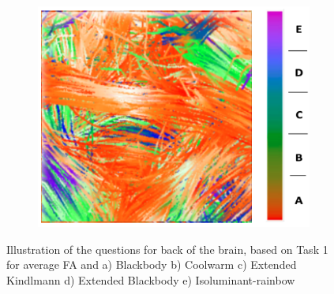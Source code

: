 \documentclass[hyperref, plainreport, noproblem]{cgvpub1}
\begin{document}
\begin{figure}[ht]
\begin{subfigure}[b]{0.45\textwidth}
    	\includegraphics[width =  \columnwidth]{isorainbow-fa}
	\caption{ }
    \end{subfigure}	
    \caption{Illustration of the questions for back of the brain, based on Task 1 for average FA and a) Blackbody b) Coolwarm c) Extended Kindlmann d) Extended Blackbody e) Isoluminant-rainbow }
    \label{fig:task1-fa}
\end{figure}
\end{document}
